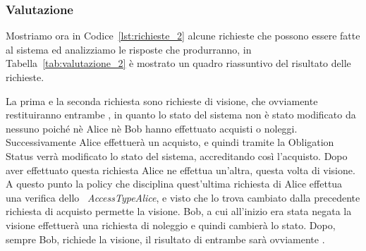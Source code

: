 \subsubsection{Valutazione}
Mostriamo ora in Codice~\ref{lst:richieste_2} alcune richieste che possono essere fatte al sistema ed analizziamo le risposte che produrranno, in Tabella~\ref{tab:valutazione_2} è mostrato un quadro riassuntivo del risultato delle richieste.

La prima e la seconda richiesta sono richieste di visione, che ovviamente restituiranno entrambe \deny, in quanto lo stato del sistema non è stato modificato da nessuno poiché nè Alice nè Bob hanno effettuato acquisti o noleggi.
Successivamente Alice effettuerà un acquisto, e quindi tramite la Obligation Status verrà modificato lo stato del sistema, accreditando così l'acquisto. Dopo aver effettuato questa richiesta Alice ne effettua un'altra, questa volta di visione. 
A questo punto la policy che disciplina quest'ultima richiesta di Alice effettua una verifica dello \statusattribute \ \textit{AccessTypeAlice}, e visto che lo trova cambiato dalla precedente richiesta di acquisto permette la visione.
Bob, a cui all'inizio era stata negata la visione effettuerà una richiesta di noleggio e quindi cambierà lo stato. Dopo, sempre Bob, richiede la visione, il risultato di entrambe sarà ovviamente \permit.

